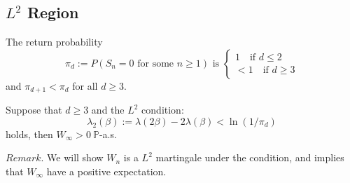 \subsection{$L^2$ Region}

\begin{proposition}
    The return probability
    \[\pi_d:= P(S_n = 0\text{ for some }n\geq 1) \text{ is } \begin{cases}
        1\quad\text{if }d\leq 2 \\ <1\quad\text{if }d\geq 3
    \end{cases}\]
    and $\pi_{d+1} < \pi_d$ for all $d\geq 3$.
\end{proposition}

\begin{theorem}
    Suppose that $d\geq 3$ and the $L^2$ condition:
    \[
    \lambda_2(\beta) := \lambda(2\beta) - 2\lambda(\beta) < \ln(1/\pi_d)
    \]
    holds, then $W_{\infty} >0\ \mathbb{P}$-a.s.
\end{theorem}
$Remark$. We will show $W_n$ is a $L^2$ martingale under the condition, and implies that $W_{\infty}$ have a positive expectation.
